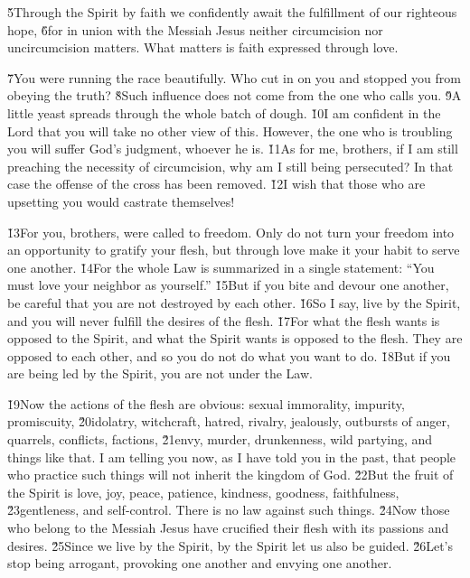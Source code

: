 \v{5}Through the Spirit by faith we confidently await the fulfillment of our righteous hope, \v{6}for in union with the Messiah Jesus neither circumcision nor uncircumcision matters. What matters is faith expressed through love.

\v{7}You were running the race beautifully. Who cut in on you and stopped you from obeying the truth? \v{8}Such influence does not come from the one who calls you. \v{9}A little yeast spreads through the whole batch of dough. \v{10}I am confident in the Lord that you will take no other view of this. However, the one who is troubling you will suffer God's judgment, whoever he is. \v{11}As for me, brothers, if I am still preaching the necessity of circumcision, why am I still being persecuted? In that case the offense of the cross has been removed. \v{12}I wish that those who are upsetting you would castrate themselves!

\v{13}For you, brothers, were called to freedom. Only do not turn your freedom into an opportunity to gratify your flesh, but through love make it your habit to serve one another. \v{14}For the whole Law is summarized in a single statement: ``You must love your neighbor as yourself.'' \v{15}But if you bite and devour one another, be careful that you are not destroyed by each other. \v{16}So I say, live by the Spirit, and you will never fulfill the desires of the flesh. \v{17}For what the flesh wants is opposed to the Spirit, and what the Spirit wants is opposed to the flesh. They are opposed to each other, and so you do not do what you want to do. \v{18}But if you are being led by the Spirit, you are not under the Law.

\v{19}Now the actions of the flesh are obvious: sexual immorality, impurity, promiscuity, \v{20}idolatry, witchcraft, hatred, rivalry, jealously, outbursts of anger, quarrels, conflicts, factions, \v{21}envy, murder, drunkenness, wild partying, and things like that. I am telling you now, as I have told you in the past, that people who practice such things will not inherit the kingdom of God. \v{22}But the fruit of the Spirit is love, joy, peace, patience, kindness, goodness, faithfulness, \v{23}gentleness, and self-control. There is no law against such things. \v{24}Now those who belong to the Messiah Jesus have crucified their flesh with its passions and desires. \v{25}Since we live by the Spirit, by the Spirit let us also be guided. \v{26}Let's stop being arrogant, provoking one another and envying one another.

